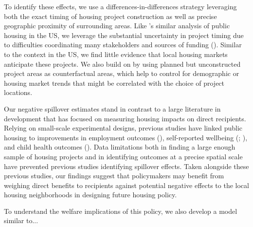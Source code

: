 \documentclass[12pt]{article}
\begin{document}
To identify these effects, we use a differences-in-differences strategy leveraging both the exact timing of housing project construction as well as precise geographic proximity of surrounding areas.  Like \cite{diamond2016wants}'s similar analysis of public housing in the US, we leverage the substantial uncertainty in project timing due to difficulties coordinating many stakeholders and sources of funding (\cite{serihistory}).  Similar to the context in the US, we find little evidence that local housing markets anticipate these projects.  We also build on \cite{diamond2016wants} by using planned but unconstructed project areas as counterfactual areas, which help to control for demographic or housing market trends that might be correlated with the choice of project locations.

Our negative spillover estimates stand in contrast to a large literature in development that has focused on measuring housing impacts on direct recipients.  Relying on small-scale experimental designs, previous studies have linked public housing to improvements in employment outcomes (\cite{franklin2016enabled}), self-reported wellbeing (\cite{galiani2017shelter}; \cite{devoto2012happiness}), and child health outcomes (\cite{cattaneo2009housing}).  Data limitations both in finding a large enough sample of housing projects and in identifying outcomes at a precise spatial scale have prevented previous studies identifying spillover effects.  Taken alongside these previous studies, our findings suggest that policymakers may benefit from weighing direct benefits to recipients against potential negative effects to the local housing neighborhoods in designing future housing policy.

To understand the welfare implications of this policy, we also develop a model similar to... 




\end{document}
